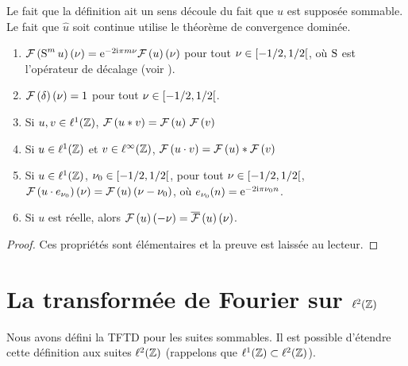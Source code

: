Le fait que la d\'{e}finition ait un sens d\'{e}coule du fait que $u$ est suppos\'{e}e sommable. Le fait que $\hat{u}$ soit continue utilise le th\'{e}or\`{e}me de convergence domin\'{e}e.

\begin{proposition}
\label{prop:propriete-TFTD}
\begin{enumerate}[label=(\roman*)]
\item $\mathcal{F}\left( \operatorname{S}^m u \right)(\nu)= \mathrm{e}^{- 2 \mathrm{i} \pi m \nu} \mathcal{F}\left( u \right)(\nu)$ pour tout $\nu \in \left[-1/2,1/2\right[$, où $\operatorname{S}$ est l'opérateur de décalage (voir ).
\item $\mathcal{F}\left( \delta \right)(\nu) = 1$ pour tout $\nu \in \left[-1/2,1/2\right[$.
\item Si $u, v \in \ell^1(\mathbb{Z})$, $\mathcal{F}\left( u * v \right)= \mathcal{F}\left( u \right) \, \mathcal{F}\left( v \right)$
\item Si $u \in \ell^1(\mathbb{Z})$ et $v \in \ell^\infty(\mathbb{Z})$, $\mathcal{F}\left( u \cdot v \right)=\mathcal{F}\left( u \right)*\mathcal{F}\left( v \right)$
\item Si $u \in \ell^1(\mathbb{Z})$, $\nu_0 \in \left[-1/2,1/2\right[$, pour tout $\nu \in \left[-1/2,1/2\right[$,
$\mathcal{F}\left(  u \cdot e_{\nu_0} \right)(\nu)= \mathcal{F}\left( u \right)(\nu - \nu_0)$, o\`u $e_{\nu_0}(n) = \mathrm{e}^{-2 \mathrm{i} \pi \nu_0 n}$.
\item Si $u$ est r\'{e}elle, alors $\mathcal{F}\left( u \right)(-\nu) = \overline{\mathcal{F}}\left( u \right)(\nu)$.
\end{enumerate}
\end{proposition}
\begin{proof}
Ces propri\'et\'es sont \'el\'ementaires et la preuve est laiss\'ee au lecteur.
\end{proof}

\section{La transform\'ee de Fourier sur $\ell^2(\mathbb{Z})$}
Nous avons d\'{e}fini la TFTD pour les suites sommables. Il est possible d'\'{e}tendre cette d\'{e}finition aux suites $\ell^2(\mathbb{Z})$ (rappelons que $\ell^1(\mathbb{Z}) \subset \ell^2(\mathbb{Z})$).

